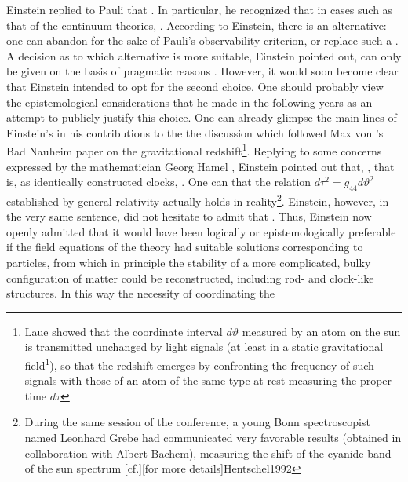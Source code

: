 \documentclass[draft]{article}
\begin{document}
Einstein replied to Pauli that  \citep[650]{Einstein1920c}. In particular, he recognized that in cases such as that of the continuum theories,  \citep[650]{Einstein1920c}. According to Einstein, there is an alternative: one can abandon  for the sake of Pauli's observability criterion, or replace such a  \citep[650]{Einstein1920c}. A decision as to which alternative is more suitable, Einstein pointed out, can only be given on the basis of pragmatic reasons \citep[650]{Einstein1920c}. However, it would soon become clear that Einstein intended to opt for the second choice. One should probably view the epistemological considerations that he made in the following years as an attempt to publicly justify this choice. One can already glimpse the main lines of Einstein's in his contributions to the the discussion which followed Max von 's Bad Nauheim paper on the gravitational redshift\footnote{Laue showed that the coordinate interval $d\vartheta$ measured by an atom on the sun is transmitted unchanged by light signals (at least in a static gravitational field\footnote{In the general case, the number of vibrations of an atom transmitted by light signals is coordinate dependent}), so that the redshift emerges by confronting the frequency of such signals with those of an atom of the same type at rest measuring the proper time $d\tau$}. Replying to some concerns expressed by the mathematician Georg Hamel \citep[cf.\ also][]{Hamel1921}, Einstein pointed out that, , that is, as identically constructed clocks,  \citep[Einstein's reply to][]{Laue1920}. One can  that the relation $d\tau^2=g_{44}d\vartheta ^2$ established by general relativity actually holds in reality\footnote{During the same session of the conference, a young Bonn spectroscopist named Leonhard Grebe had communicated very favorable results (obtained in collaboration with Albert Bachem), measuring the shift of the cyanide band of the sun spectrum [cf.][for more details]{Hentschel1992}}. Einstein, however, in the very same sentence, did not hesitate to admit that  \citep[Einstein's reply to][662\me]{Laue1920}. Thus, Einstein now openly admitted that it would have been logically or epistemologically preferable if the field equations of the theory had suitable solutions corresponding to particles, from which in principle the stability of a more complicated, bulky configuration of matter could be reconstructed, including rod- and clock-like structures. In this way the necessity of coordinating the 
\end{document}
